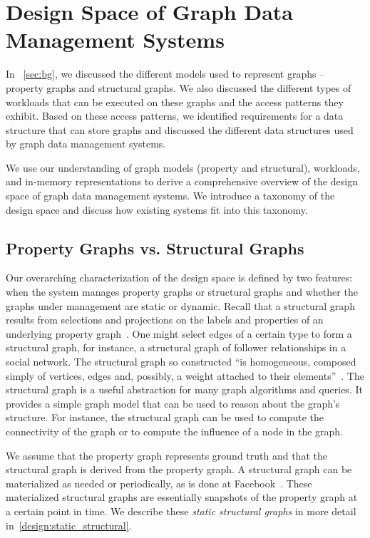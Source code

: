 \chapter{Design Space of Graph Data Management Systems}
\label{chap:design_space}

In ~\autoref{sec:bg}, we discussed the different models used to represent graphs -- property graphs and structural graphs. 
We also discussed the different types of workloads that can be executed on these graphs and the access patterns they exhibit.
Based on these access patterns, we identified requirements for a data structure that can store graphs and discussed the different data structures used by graph data management systems.

We use our understanding of graph models (property and structural), workloads, and in-memory representations to derive a comprehensive overview of the design space of graph data management systems.
We introduce a taxonomy of the design space and discuss how existing systems fit into this taxonomy.


\section{Property Graphs vs. Structural Graphs}
\label{design:property_vs_structural}
Our overarching characterization of the design space is defined by two features: when the system manages property graphs or structural graphs and whether the graphs under management are static or dynamic.
Recall that a structural graph results from selections and projections on the labels and properties of an underlying property graph~\cite{RodriguezNeubauer2010}.
One might select edges of a certain type to form a structural graph, for instance, a structural graph of follower relationships in a social network.
The structural graph so constructed ``is homogeneous, composed simply of vertices, edges and, possibly, a weight attached to their elements''~\cite{teseo2021deLeo}.
The structural graph is a useful abstraction for many graph algorithms and queries. It provides a simple graph model that can be used to reason about the graph's structure.
For instance, the structural graph can be used to compute the connectivity of the graph or to compute the influence of a node in the graph.

We assume that the property graph represents ground truth and that the structural graph is derived from the property graph.
A structural graph can be materialized as needed or periodically, as is done at Facebook~\cite{curtiss2013unicorn}.
These materialized structural graphs are essentially snapshots of the property graph at a certain point in time.
We describe these \emph{static structural graphs} in more detail in~\autoref{design:static_structural}.


